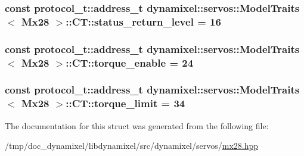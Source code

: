 \subsubsection[{status\+\_\+return\+\_\+level}]{\setlength{\rightskip}{0pt plus 5cm}const {\bf protocol\+\_\+t\+::address\+\_\+t} {\bf dynamixel\+::servos\+::\+Model\+Traits}$<$ {\bf Mx28} $>$\+::C\+T\+::status\+\_\+return\+\_\+level = 16\hspace{0.3cm}{\ttfamily [static]}}\label{structdynamixel_1_1servos_1_1_model_traits_3_01_mx28_01_4_1_1_c_t_a6440b867d4ce245168f155bed633211e}
\hypertarget{structdynamixel_1_1servos_1_1_model_traits_3_01_mx28_01_4_1_1_c_t_a4aef6f10002851aee9ec792fd9b1744d}{}
\subsubsection[{torque\+\_\+enable}]{\setlength{\rightskip}{0pt plus 5cm}const {\bf protocol\+\_\+t\+::address\+\_\+t} {\bf dynamixel\+::servos\+::\+Model\+Traits}$<$ {\bf Mx28} $>$\+::C\+T\+::torque\+\_\+enable = 24\hspace{0.3cm}{\ttfamily [static]}}\label{structdynamixel_1_1servos_1_1_model_traits_3_01_mx28_01_4_1_1_c_t_a4aef6f10002851aee9ec792fd9b1744d}
\hypertarget{structdynamixel_1_1servos_1_1_model_traits_3_01_mx28_01_4_1_1_c_t_aea2d3c35d6d70ec41e6e1e1bf32534df}{}
\subsubsection[{torque\+\_\+limit}]{\setlength{\rightskip}{0pt plus 5cm}const {\bf protocol\+\_\+t\+::address\+\_\+t} {\bf dynamixel\+::servos\+::\+Model\+Traits}$<$ {\bf Mx28} $>$\+::C\+T\+::torque\+\_\+limit = 34\hspace{0.3cm}{\ttfamily [static]}}\label{structdynamixel_1_1servos_1_1_model_traits_3_01_mx28_01_4_1_1_c_t_aea2d3c35d6d70ec41e6e1e1bf32534df}


The documentation for this struct was generated from the following file\+:\begin{DoxyCompactItemize}
\item 
/tmp/doc\+\_\+dynamixel/libdynamixel/src/dynamixel/servos/\hyperlink{mx28_8hpp}{mx28.\+hpp}\end{DoxyCompactItemize}
